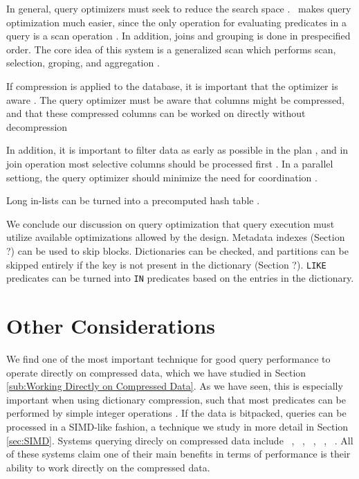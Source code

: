 In general, query optimizers must seek to reduce the search space \cite{Boncz2002-yj, Stonebraker2005-qz}. \blink~makes query optimization much easier, since the only operation for evaluating predicates in a query is a scan operation \cite{Barber2012-xt}. In addition, joins and grouping is done in prespecified order. The core idea of this system is a generalized scan which performs scan, selection, groping, and aggregation \cite{Raman2008-gi}. 

If compression is applied to the database, it is important that the optimizer is aware \cite{Westmann200-mz}. The query optimizer must be aware that columns might be compressed, and that these compressed columns can be worked on directly without decompression \cite{Stonebraker2005-qz}

In addition, it is important to filter data as early as possible in the plan \cite{Lamb2012-kg}, and in join operation  most selective columns should be processed first \cite{Holloway2008-rr}. In a parallel settiong, the query optimizer should minimize the need for coordination \cite{Exasol2014-xh}.

Long in-lists can be turned into a precomputed hash table \cite{Raman2013-em}.

We conclude our discussion on query optimization that query execution must utilize available optimizations allowed by the design. Metadata indexes (Section ?) can be used to skip blocks. Dictionaries can be checked, and partitions can be skipped entirely if the key is not present in the dictionary (Section ?). \texttt{LIKE} predicates can be turned into \texttt{IN} predicates based on the entries in the dictionary.


\section{Other Considerations}
\label{sec:Other Considerations}
We find one of the most important technique for good query performance to operate directly on compressed data, which we have studied in Section \ref{sub:Working Directly on Compressed Data}. As we have seen, this is especially important when using dictionary compression, such that most predicates can be performed by simple integer operations \cite{Abadi2008-dd}. If the data is bitpacked, queries can be processed in a SIMD-like fashion, a technique we study in more detail in Section \ref{sec:SIMD}. Systems querying direcly on compressed data include \cstore~\cite{Stonebraker-qz}, \ibm~\cite{Raman2013-em}, \mssql~\cite{Larson2013-mc}, \blink~\cite{Johnson2008-cp}, \sapnw~\cite{Lemke2010-is}. All of these systems claim one of their main benefits in terms of performance is their ability to work directly on the compressed data.


